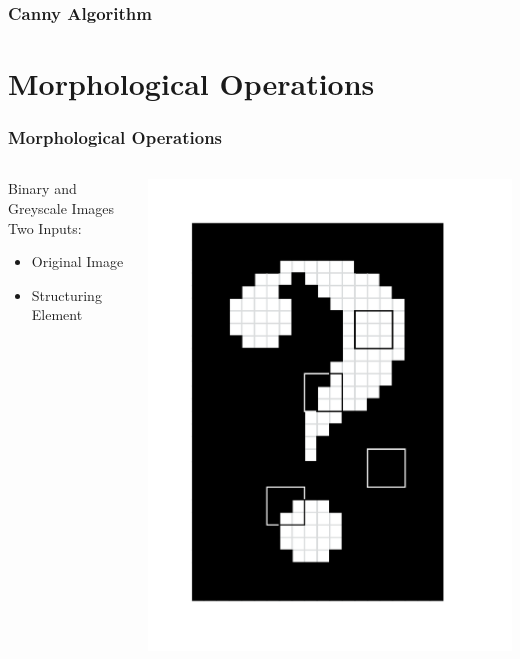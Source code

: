 \documentclass{beamer}
\begin{document}
\begin{frame}
\frametitle{Canny Algorithm}
\end{frame}

\section[Morphological Operations]{Morphological Operations}

\begin{frame}
\frametitle{Morphological Operations}
\begin{columns}
\begin{column}{0.5\textwidth}
Binary and Greyscale Images
\linebreak
\linebreak
Two Inputs:
\begin{itemize}
\item Original Image
\item Structuring Element
\end{itemize}
\end{column}
\begin{column}{0.5\textwidth}
\includegraphics[width=1\textwidth]{structuring_element_placement}
\end{column}
\end{columns}
\end{frame}
\end{document}
